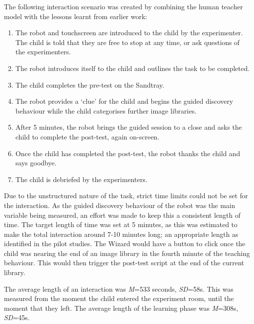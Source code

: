 The following interaction scenario was created by combining the human teacher model with the lessons learnt from earlier work:
\begin{enumerate}
	\item The robot and touchscreen are introduced to the child by the experimenter. The child is told that they are free to stop at any time, or ask questions of the experimenters.
	\item The robot introduces itself to the child and outlines the task to be completed.
	\item The child completes the pre-test on the Sandtray.
	\item The robot provides a `clue' for the child and begins the guided discovery behaviour while the child categorises further image libraries.
	\item After 5 minutes, the robot brings the guided session to a close and asks the child to complete the post-test, again on-screen.
	\item Once the child has completed the post-test, the robot thanks the child and says goodbye.
	\item The child is debriefed by the experimenters.
\end{enumerate}

Due to the unstructured nature of the task, strict time limits could not be set for the interaction. As the guided discovery behaviour of the robot was the main variable being measured, an effort was made to keep this a consistent length of time. The target length of time was set at 5 minutes, as this was estimated to make the total interaction around 7-10 minutes long; an appropriate length as identified in the pilot studies. The Wizard would have a button to click once the child was nearing the end of an image library in the fourth minute of the teaching behaviour. This would then trigger the post-test script at the end of the current library.

The average length of an interaction was \textit{M}=533 seconds, \textit{SD}=58s. This was measured from the moment the child entered the experiment room, until the moment that they left. The average length of the learning phase was \textit{M}=308s, \textit{SD}=45s.

